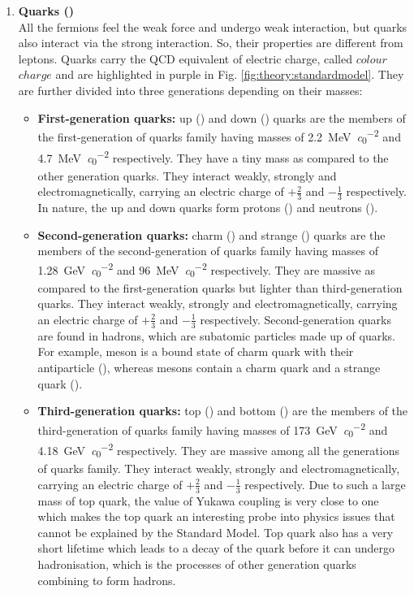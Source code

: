 \begin{enumerate}
	\item \textbf{Quarks (\Pquark)} \label{sec:theory:standardmodel:fundamentalparticles:fermion:quarks}
	\\ All the fermions feel the weak force and undergo weak interaction, but quarks also interact via the strong interaction. So, their properties are different from leptons. Quarks carry the QCD equivalent of electric charge, called $colour$ $charge$ and are highlighted in purple in Fig. \ref{fig:theory:standardmodel}. They are further divided into three generations depending on their masses:
	
	\begin{itemize}
		\item \textbf{First-generation quarks:} up (\Pup) and down (\Pdown) quarks are the members of the first-generation of quarks family having masses of \SI[per-mode=symbol]{2.2}{\mega\electronvolt\per\clight^2} and \SI[per-mode=symbol]{4.7}{\mega\electronvolt\per\clight^2} respectively. They have a tiny mass as compared to the other generation quarks. They interact weakly, strongly and electromagnetically, carrying an electric charge of $+\frac{2}{3}$ and $-\frac{1}{3}$ respectively. In nature, the up and down quarks form protons (\Pup \Pup \Pdown) and neutrons (\Pup \Pdown \Pdown).
		
		\item \textbf{Second-generation quarks:} charm (\Pcharm) and strange (\Pstrange) quarks are the members of the second-generation of quarks family having masses of \SI[per-mode=symbol]{1.28}{\giga\electronvolt\per\clight^2} and \SI[per-mode=symbol]{96}{\mega\electronvolt\per\clight^2} respectively. They are massive as compared to the first-generation quarks but lighter than third-generation quarks. They interact weakly, strongly and electromagnetically, carrying an electric charge of $+\frac{2}{3}$ and $-\frac{1}{3}$ respectively. Second-generation quarks are found in hadrons, which are subatomic particles made up of quarks. For example, \PJpsi meson is a bound state of charm quark with their antiparticle (\Pcharm\APcharm), whereas \PDs mesons contain a charm quark and a strange quark (\Pcharm\Pstrange).
		
		\item \textbf{Third-generation quarks:} top (\Ptop) and bottom (\Pbottom) are the members of the third-generation of quarks family having masses of \SI[per-mode=symbol]{173}{\giga\electronvolt\per\clight^2} and \SI[per-mode=symbol]{4.18}{\giga\electronvolt\per\clight^2} respectively. They are massive among all the generations of quarks family. They interact weakly, strongly and electromagnetically, carrying an electric charge of $+\frac{2}{3}$ and $-\frac{1}{3}$ respectively. Due to such a large mass of top quark, the value of Yukawa coupling is very close to one which makes the top quark an interesting probe into physics issues that cannot be explained by the Standard Model. Top quark also has a very short lifetime which leads to a decay of the quark before it can undergo hadronisation, which is the processes of other generation quarks combining to form hadrons.
	\end{itemize}
	

\end{enumerate}
